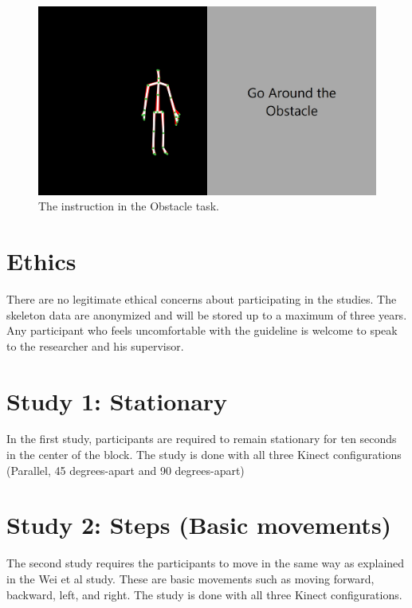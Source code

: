 \begin{figure}[!h]
  \centering

  \includegraphics[width=0.8\linewidth]{figs/obstacle_task_instruction}
  
  \caption{The instruction in the Obstacle task.}

  \label{fig:obstacle_task_instruction}
\end{figure}

\section{Ethics}
\label{sec:studies_ethics}

There are no legitimate ethical concerns about participating in the studies. The skeleton data are anonymized and will be stored up to a maximum of three years. Any participant who feels uncomfortable with the guideline is welcome to speak to the researcher and his supervisor.

\section{Study 1: Stationary}
\label{sec:studies_stationary}

In the first study, participants are required to remain stationary for ten seconds in the center of the block. The study is done with all three Kinect configurations (Parallel, 45 degrees-apart and 90 degrees-apart)

\section{Study 2: Steps (Basic movements)}
\label{sec:studies_stationary}

The second study requires the participants to move in the same way as explained in the Wei et al study. These are basic movements such as moving forward, backward, left, and right. The study is done with all three Kinect configurations.

